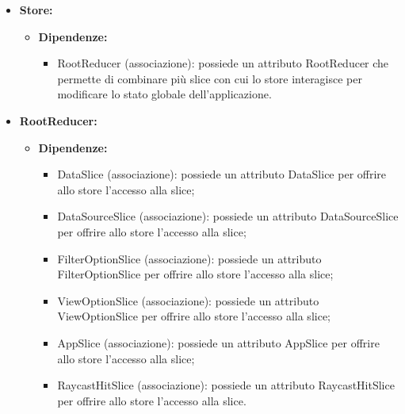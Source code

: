 \begin{itemize}
    \item \textbf{Store:}
          \begin{itemize}
              \item \textbf{Dipendenze:}
                    \begin{itemize}
                        \item RootReducer (associazione): possiede un attributo RootReducer che permette di
                              combinare più slice con cui lo store interagisce per modificare lo stato
                              globale dell'applicazione.
                    \end{itemize}
          \end{itemize}

    \item \textbf{RootReducer:}
          \begin{itemize}
              \item \textbf{Dipendenze:}
                    \begin{itemize}
                        \item DataSlice (associazione): possiede un attributo DataSlice per offrire allo
                              store l'accesso alla slice;
                        \item DataSourceSlice (associazione): possiede un attributo DataSourceSlice per
                              offrire allo store l'accesso alla slice;
                        \item FilterOptionSlice (associazione): possiede un attributo FilterOptionSlice per
                              offrire allo store l'accesso alla slice;
                        \item ViewOptionSlice (associazione): possiede un attributo ViewOptionSlice per
                              offrire allo store l'accesso alla slice;
                        \item AppSlice (associazione): possiede un attributo AppSlice per offrire allo store
                              l'accesso alla slice;
                        \item RaycastHitSlice (associazione): possiede un attributo RaycastHitSlice per
                              offrire allo store l'accesso alla slice.
                    \end{itemize}
          \end{itemize}
\end{itemize}

